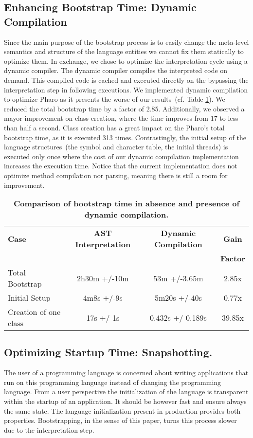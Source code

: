 \subsection*{Enhancing Bootstrap Time: Dynamic Compilation}
Since the main purpose of the bootstrap process is to easily change the meta-level semantics and structure of the language entities we cannot fix them statically to optimize them. In exchange, we chose to optimize the interpretation cycle using a dynamic compiler. The dynamic compiler compiles the interpreted code on demand. This compiled code is cached and executed directly on the \VM bypassing the interpretation step in following executions. We implemented dynamic compilation to optimize Pharo as it presents the worse of our results~(cf. Table \ref{tb:dynamic_compilation}). We reduced the total bootstrap time by a factor of 2.85. Additionally, we observed a mayor improvement on class creation, where the time improves from 17 to less than half a second. Class creation has a great impact on the Pharo's total bootstrap time, as it is executed 313 times. Contrastingly, the initial setup of the language structures~(\eg the symbol and character table, the initial threads) is executed only once where the cost of our dynamic compilation implementation increases the execution time. Notice that the current implementation does not optimize method compilation nor parsing, meaning there is still a room for improvement.

 \begin{table}[ht]
 \small
 	\centering
 	\begin{tabular}{lccc}
			\toprule
			\textbf{Case}
 			& \textbf{AST Interpretation}
			& \textbf{Dynamic Compilation}
			& \textbf{Gain}\\
			&&& \textbf{Factor}\\
		\toprule
		Total Bootstrap & 2h30m +/-10m & 53m +/-3.65m & 2.85x\\\midrule
 		Initial Setup& 4m8s +/-9s & 5m20s +/-40s & 0.77x\\\midrule
		Creation of one class & 17s +/-1s & 0.432s +/-0.189s & 39.85x\\\bottomrule
 	\end{tabular}
	\vspace*{0.2cm}
 	\caption{\small\textbf{Comparison of bootstrap time in absence and presence of dynamic compilation.}\label{tb:dynamic_compilation}}
 \end{table}

\subsection*{Optimizing Startup Time: Snapshotting.}
The user of a programming language is concerned about writing applications that run on this programming language instead of changing the programming language. From a user perspective the initialization of the language is transparent within the startup of an application. It should be however fast and ensure always the same state.
The language initialization present in production \VMs provides both properties. Bootstrapping, in the sense of this paper, turns this process slower due to the interpretation step.

